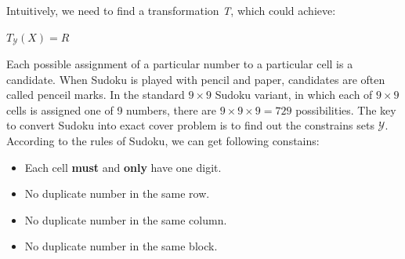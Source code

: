 \documentclass{mcmthesis}
\begin{document}
Intuitively, we need to find a transformation \textit{T}, which could achieve: \newline

\centerline{$\textit{T}_{\mathcal{Y}}(X) = R$}
Each possible assignment of a particular number to a particular cell is a candidate. When Sudoku is played with pencil and paper, candidates are often called penceil marks. In the standard $9\times9$ Sudoku variant, in which each of $9\times9$ cells is assigned one of 9 numbers, there are $9\times9\times9=729$ possibilities. The key to convert Sudoku into exact cover problem is to find out the constrains sets $\mathcal{Y}$. According to the rules of Sudoku, we can get following constains: \newline
\begin{itemize}
	\item Each cell \textbf{must} and \textbf{only} have one digit.
	\item No duplicate number in the same row.
	\item No duplicate number in the same column.
	\item No duplicate number in the same block.
\end{itemize}
\end{document}
